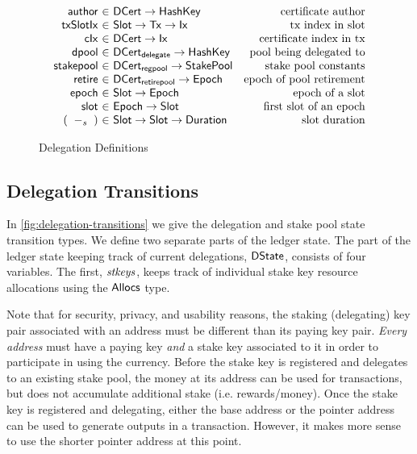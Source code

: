 \begin{figure}
\begin{equation*}
\begin{array}{r@{~\in~}lr}
  \fun{author} & \DCert \to \HashKey
  & \text{certificate author}
  \\
  \fun{txSlotIx} & \Slot \to \Tx \to \Ix
  & \text{tx index in slot}
  \\
  \fun{cIx} & \DCert \to \Ix
  & \text{certificate index in tx}
  \\
  \fun{dpool} & \DCertDeleg \to \HashKey
  & \text{pool being delegated to}
  \\
  \fun{stakepool} & \DCertRegPool \to \StakePool
  & \text{stake pool constants}
  \\
  \fun{retire} & \DCertRetirePool \to \Epoch
  & \text{epoch of pool retirement}
  \\
  \fun{epoch} & \Slot \to \Epoch
  & \text{epoch of a slot}
  \\
  \fun{slot} & \Epoch \to \Slot
  & \text{first slot of an epoch}
  \\
    (\slotminus{}{}) & \Slot \to \Slot \to \Duration
  & \text{slot duration}
  \end{array}
  \end{equation*}

  \caption{Delegation Definitions}
  \label{fig:delegation-definitons}
\end{figure}

\clearpage

\subsection{Delegation Transitions}
\label{sec:deleg-trans}


In \cref{fig:delegation-transitions} we give the delegation and stake pool
state transition types. We define two separate parts of the ledger state.
The part of the ledger state keeping track of current delegations, $\mathsf{DState}$,
consists of four variables. The first, $\mathit{stkeys}$, keeps track of individual
stake key resource allocations using the $\mathsf{Allocs}$ type.

Note that for security, privacy, and usability reasons, the staking (delegating)
key pair associated with an address must be different than its paying key pair.
\textit{Every address} must have a paying key \textit{and} a stake key
associated to it in order to participate in using the currency. Before the
stake key is registered and delegates to an existing stake pool,
the money at its address can be used for
transactions, but does not accumulate additional stake (i.e. rewards/money).
Once the stake key is registered and delegating, either the base address or
the pointer address can be used to generate outputs
in a transaction. However, it makes more sense to use the shorter pointer
address at this point. 


